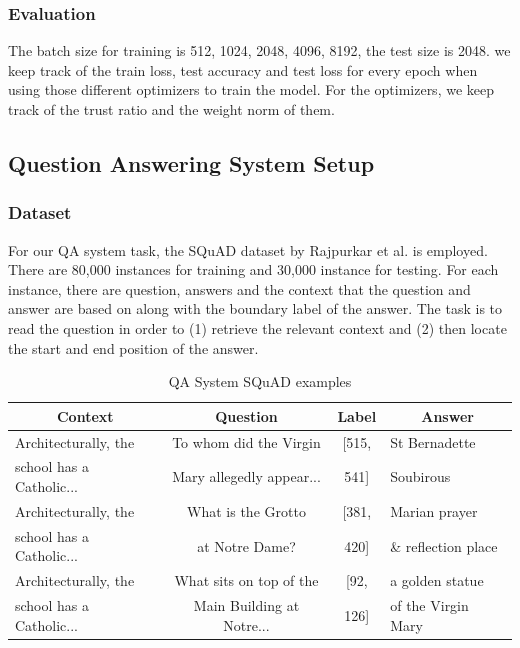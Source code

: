 \subsubsection{Evaluation}

The batch size for training is {512, 1024, 2048, 4096, 8192}, the test size is 2048. we keep track of the train loss, test accuracy and test loss for every epoch when using those different optimizers to train the model. For the optimizers, we keep track of the trust ratio and the weight norm of them.


\subsection{Question Answering System Setup}

\subsubsection{Dataset}

For our QA system task, the SQuAD dataset by Rajpurkar et al. \cite{} is employed. There are 80,000 instances for training and 30,000 instance for testing. For each instance, there are question, answers and the context that the question and answer are based on along with the boundary label of the answer. The task is to read the question in order to (1) retrieve the relevant context and (2) then locate the start and end position of the answer. 

\begin{table}[!t]
\vspace{-5pt}
\scriptsize
\vspace{7pt}
\caption{QA System SQuAD examples}\label{tbl:planofwork}
\vspace{-10pt}
\begin{center}
\begin{tabular}{ l|c|c|l}
 \multicolumn{1}{c|}{Context} &
 \multicolumn{1}{c|}{Question} &
 \multicolumn{1}{c|}{Label} &
 \multicolumn{1}{c}{Answer}\\
\hline
Architecturally, the  & To whom did the Virgin  & [515,  & St Bernadette 
\\
school has a Catholic...  & Mary allegedly appear... & 541] & Soubirous \\ \hline

Architecturally, the  & What is the Grotto  & [381,  & Marian prayer 
\\
school has a Catholic...  & at Notre Dame? & 420] & \& reflection place \\ \hline

Architecturally, the  & What sits on top of the	  & [92,  & a golden statue 
\\
school has a Catholic...  & Main Building at Notre... & 126] & of the Virgin Mary \\ 

\end{tabular}
\end{center}
\vspace{-15pt}
\end{table}


